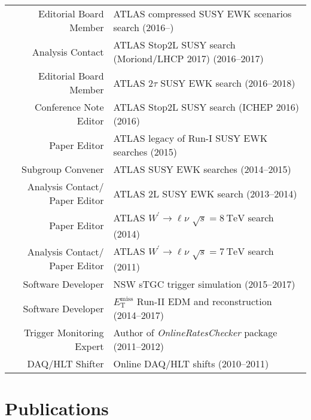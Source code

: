 \documentclass[a4paper,10pt]{article}
\begin{document}
\begin{tabular}{r | p{12cm}}
\multicolumn{1}{r|}{Editorial Board Member}		& ATLAS compressed SUSY EWK scenarios search \hfill (2016--\phantom{0000})				\\
\multicolumn{1}{r|}{Analysis Contact}				& ATLAS Stop2L SUSY search (Moriond/LHCP 2017)  \hfill (2016--2017)					\\
\multicolumn{1}{r|}{Editorial Board Member}		& ATLAS 2$\tau$ SUSY EWK search \hfill (2016--2018)				\\
\multicolumn{1}{r|}{Conference Note Editor}		& ATLAS Stop2L SUSY search (ICHEP 2016) \hfill (2016)					\\
\multicolumn{1}{r|}{Paper Editor}				& ATLAS legacy of Run-I SUSY EWK searches \hfill (2015) 		\\ 
\multicolumn{1}{r|}{Subgroup Convener}			& ATLAS SUSY EWK searches \hfill (2014--2015)				\\
\multicolumn{1}{r|}{Analysis Contact/ Paper Editor}	& ATLAS 2L SUSY EWK search \hfill (2013--2014)				\\
\multicolumn{1}{r|}{Paper Editor}				& ATLAS $W^{\prime}\rightarrow\ell\nu$ $\sqrt{s} = 8\ \mathrm{TeV}$  search \hfill (2014)		\\
\multicolumn{1}{r|}{Analysis Contact/ Paper Editor}	& ATLAS $W^{\prime}\rightarrow\ell\nu$ $\sqrt{s} = 7\ \mathrm{TeV}$ search \hfill (2011)		\\
\multicolumn{1}{r|}{Software Developer}			& NSW sTGC trigger simulation \hfill (2015--2017)	\\
\multicolumn{1}{r|}{Software Developer}			& $E_{\mathrm{T}}^{\mathrm{miss}}$ Run-II EDM and reconstruction \hfill (2014--2017)	\\
\multicolumn{1}{r|}{Trigger Monitoring Expert}		& Author of {\it OnlineRatesChecker} package \hfill (2011--2012)	\\
\multicolumn{1}{r|}{DAQ/HLT Shifter}				& Online DAQ/HLT shifts	\hfill (2010--2011)					\\
\end{tabular}

\vspace{3mm}
\section{Publications}
\end{document}
